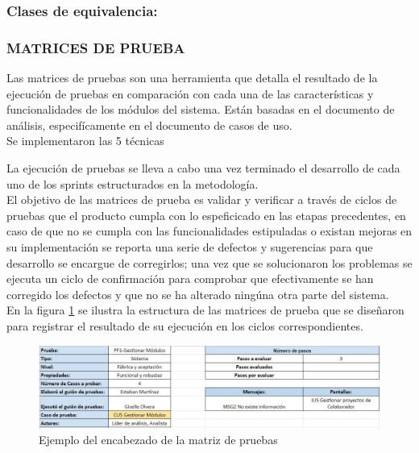 \subsubsection{Clases de equivalencia:}


\subsubsection{MATRICES DE PRUEBA}

Las matrices de pruebas son una herramienta que detalla el resultado de la ejecución de pruebas en comparación con cada una de las características y funcionalidades de los módulos del sistema. Están basadas en el documento de análisis, especifícamente en el documento de casos de uso.\\

Se implementaron las 5 técnicas 

La ejecución de pruebas se lleva a cabo una vez terminado el desarrollo de cada uno de los sprints estructurados en la metodología.\\

El objetivo de las matrices de prueba es validar y verificar a través de ciclos de pruebas que el producto cumpla con lo espeficicado en las etapas precedentes, en caso de que no se cumpla con las funcionalidades estipuladas o existan mejoras en su implementación se reporta una serie de defectos y sugerencias para que desarrollo se encargue de corregirlos; una vez que se solucionaron los problemas se ejecuta un ciclo de confirmación para comprobar que efectivamente se han corregido los defectos y que no se ha alterado ningúna otra parte del sistema.\\

En la figura \ref{fig:encabezado} se ilustra la estructura de las matrices de prueba que se diseñaron para registrar el resultado de su ejecución en los ciclos correspondientes.

\begin{figure}[H]
	\begin{center}
		\includegraphics[width=.95\textwidth]{images/pruebas/diseno/encabezado}
		\caption{Ejemplo del encabezado de la matriz de pruebas}
		\label{fig:encabezado}
	\end{center}
\end{figure}


